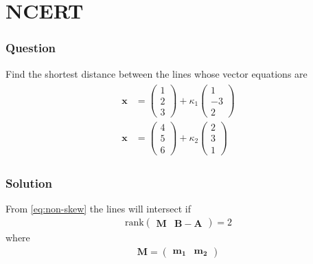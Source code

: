 \documentclass{beamer}
\providecommand{\rank}{\text{rank}}
\theoremstyle{remark}
\newcommand{\myvec}[1]{\ensuremath{\begin{pmatrix}#1\end{pmatrix}}}
\let\vec\mathbf
\begin{document}
\section{NCERT}
\begin{frame}
\frametitle{Question}
Find the shortest distance between the lines whose vector equations are
    \begin{align}
\begin{split}
	\vec{x} &= \myvec{1\\2\\3} + \kappa_1\myvec{1\\-3\\2}
	\\
	\vec{x} &= \myvec{4\\5\\6} + \kappa_2\myvec{2\\3\\1}
\end{split}
        \label{eq:chapters/12/11/2/16/L2/svd}
    \end{align}
%		
\end{frame}
\begin{frame}
\frametitle{Solution}
	From \eqref{eq:non-skew}
the lines
will intersect if 
\begin{align}
	\rank\myvec{\vec{M}  &
	 \vec{B}-\vec{A}} = 2 
	    \label{eq:chapters/12/11/2/16/lsq/rank}
\end{align}
where
\begin{align}
	\vec{M} = 
	\myvec{\vec{m_1} & \vec{m_2}} 
\end{align}
\end{frame}
\end{document}
